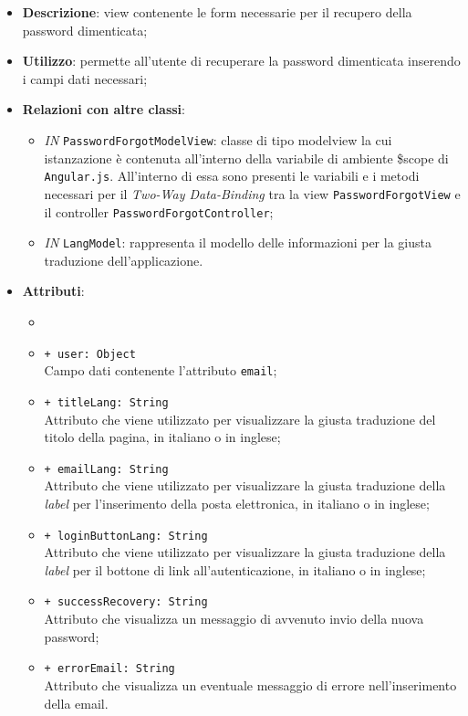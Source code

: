 \begin{itemize}
	\item \textbf{Descrizione}: view contenente le form necessarie per il recupero della password dimenticata;
	\item \textbf{Utilizzo}: permette all'utente di recuperare la password dimenticata inserendo i campi dati necessari;
	\item \textbf{Relazioni con altre classi}:
	\begin{itemize}
			\item \textit{IN} \texttt{PasswordForgotModelView}: classe di tipo modelview la cui istanzazione è contenuta all'interno della variabile di ambiente \$scope di \texttt{Angular.js}. All'interno di essa sono presenti le variabili e i metodi necessari per il \textit{Two-Way Data-Binding} tra la view \texttt{PasswordForgotView} e il controller \texttt{PasswordForgotController};
			\item \textit{IN} \texttt{LangModel}: rappresenta il modello delle informazioni per la giusta traduzione dell'applicazione.
	\end{itemize}
	\item \textbf{Attributi}:
	\begin{itemize}
		\item \item \texttt{+ user: Object} \\ Campo dati contenente l'attributo \texttt{email};
		\item \texttt{+ titleLang: String} \\ Attributo che viene utilizzato per visualizzare la giusta traduzione del titolo della pagina, in italiano o in inglese;
		\item \texttt{+ emailLang: String} \\ Attributo che viene utilizzato per visualizzare la giusta traduzione della \textit{label} per l'inserimento della posta elettronica, in italiano o in inglese;
		\item \texttt{+ loginButtonLang: String} \\ Attributo che viene utilizzato per visualizzare la giusta traduzione della \textit{label} per il bottone di link all'autenticazione, in italiano o in inglese;
		\item \texttt{+ successRecovery: String} \\ Attributo che visualizza un messaggio di avvenuto invio della nuova password;
		\item \texttt{+ errorEmail: String} \\ Attributo che visualizza un eventuale messaggio di errore nell'inserimento della email.
	\end{itemize}
\end{itemize}


